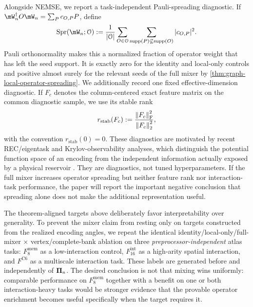 Alongside NEMSE, we report a task-independent Pauli-spreading diagnostic.  If
$\reservoirUnitary_n^\dagger O\reservoirUnitary_n=\sum_Pc_{O,P}P$, define
\begin{equation}
    \spreadScore(\reservoirUnitary_n;\mathcal O)
    :=\frac1{|\mathcal O|}\sum_{O\in\mathcal O}
      \sum_{\operatorname{supp}(P)\not\subseteq\operatorname{supp}(O)}
      |c_{O,P}|^2.
    \label{eq:pauli-spread-score}
\end{equation}
Pauli orthonormality makes this a normalized fraction of operator weight that
has left the seed support.  It is exactly zero for the identity and local-only
controls and positive almost surely for the relevant seeds of the full mixer
by \cref{thm:graph-local-operator-spreading}.  We additionally record one fixed effective-dimension diagnostic.  If
$F_c$ denotes the column-centered exact feature matrix on the common diagnostic
sample, we use its stable rank
\begin{equation}
    r_{\mathrm{stab}}(F_c)
      :=\frac{\left\lVert F_c\right\rVert_{\mathrm F}^2}{\left\lVert F_c\right\rVert_2^2},
    \label{eq:stable-feature-rank}
\end{equation}
with the convention $r_{\mathrm{stab}}(0)=0$.  These diagnostics are motivated
by recent REC/eigentask and Krylov-observability analyses, which distinguish
the potential function space of an encoding from the independent information
actually exposed by a physical reservoir
\citep{HuEtAl2023Eigentasks,CindrakLudgeJaurigue2025,CindrakJaurigueLudge2025}.
They are diagnostics, not tuned hyperparameters.  If the full mixer increases
operator spreading but neither feature rank nor interaction-task performance,
the paper will report the important negative conclusion that spreading alone
does not make the additional representation useful.

The theorem-aligned targets above deliberately favor interpretability over
generality.  To prevent the mixer claim from resting only on targets constructed
from the realized encoding angles, we repeat the identical
identity/local-only/full-mixer $\times$ vertex/complete-bank ablation on three
\emph{preprocessor-independent} atlas tasks:
$F^{\mathrm{mem}}_{8}$ as a low-interaction control,
$F^{\mathrm{int}}_{16}$ as a high-arity spatial interaction, and
$F^{\mathrm{C6}}$ as a multiscale interaction task.  These labels are generated
before and independently of $\bm{\Pi}_n$.  The desired conclusion is not
that mixing wins uniformly: comparable performance on
$F^{\mathrm{mem}}_{8}$ together with a benefit on one or both interaction-heavy
tasks would be stronger evidence that the provable operator enrichment becomes
useful specifically when the target requires it.

